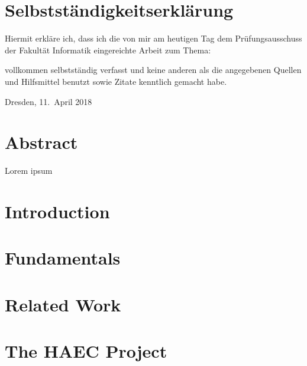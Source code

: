 \documentclass[
	paper=a4,
	fontsize=11pt,
	parskip=full %
]{scrreprt}
\begin{document}
	\chapter*{Selbstständigkeitserklärung}
	Hiermit erkläre ich, dass ich die von mir am heutigen Tag dem Prüfungsausschuss der Fakultät Informatik eingereichte Arbeit zum Thema:
	\begin{center}
		\textit{\thetitle} 
	\end{center}
	
	vollkommen selbstständig verfasst und keine anderen als die angegebenen Quellen und Hilfsmittel benutzt sowie Zitate kenntlich gemacht habe.
	
	Dresden, 11.\ April 2018 \\ %
	\theauthor
	
	
	\chapter*{Abstract}
    Lorem ipsum
	
	\tableofcontents
	
	
	\listoftables
	\vspace{-2.6\baselineskip}
	\begingroup
	\let\clearpage\relax
	\listoffigures
	\endgroup
	
	
	\chapter{Introduction}\label{ch:introduction}
    
    
    \chapter{Fundamentals}\label{ch:fundamentals}
    

    \chapter{Related Work}\label{ch:relatedwork}
    

    \chapter{The HAEC Project}
\end{document}

